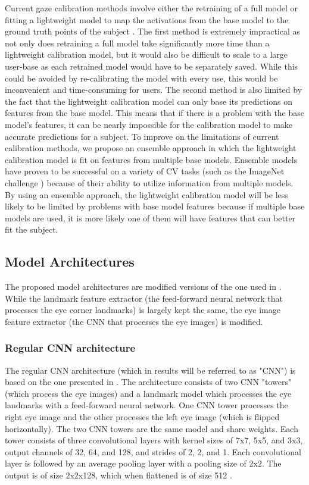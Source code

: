 \documentclass{article}
\begin{document}
Current gaze calibration methods involve either the retraining of a full model or fitting a lightweight model to map the activations from the base model to the ground truth points of the subject \cite{googlepaper}. The first method is extremely impractical as not only does retraining a full model take significantly more time than a lightweight calibration model, but it would also be difficult to scale to a large user-base as each retrained model would have to be separately saved. While this could be avoided by re-calibrating the model with every use, this would be inconvenient and time-consuming for users. The second method is also limited by the fact that the lightweight calibration model can only base its predictions on features from the base model. This means that if there is a problem with the base model's features, it can be nearly impossible for the calibration model to make accurate predictions for a subject. To improve on the limitations of current calibration methods, we propose an ensemble approach in which the lightweight calibration model is fit on features from multiple base models. Ensemble models have proven to be successful on a variety of CV tasks (such as the ImageNet challenge \cite{ensemblepaper}) because of their ability to utilize information from multiple models. By using an ensemble approach, the lightweight calibration model will be less likely to be limited by problems with base model features because if multiple base models are used, it is more likely one of them will have features that can better fit the subject.
\subsection{Model Architectures}
The proposed model architectures are modified versions of the one used in \cite{googlepaper}. While the landmark feature extractor (the feed-forward neural network that processes the eye corner landmarks) is largely kept the same, the eye image feature extractor (the CNN that processes the eye images) is modified.
\subsubsection{Regular CNN architecture}
The regular CNN architecture (which in results will be referred to as "CNN") is based on the one presented in \cite{googlepaper}. The architecture consists of two CNN "towers" (which process the eye images) and a landmark model which processes the eye landmarks with a feed-forward neural network. One CNN tower processes the right eye image and the other processes the left eye image (which is flipped horizontally). The two CNN towers are the same model and share weights. Each tower consists of three convolutional layers with kernel sizes of 7x7, 5x5, and 3x3, output channels of 32, 64, and 128, and strides of 2, 2, and 1. Each convolutional layer is followed by an average pooling layer with a pooling size of 2x2. The output is of size 2x2x128, which when flattened is of size 512 \cite{googlepaper}.
\end{document}
